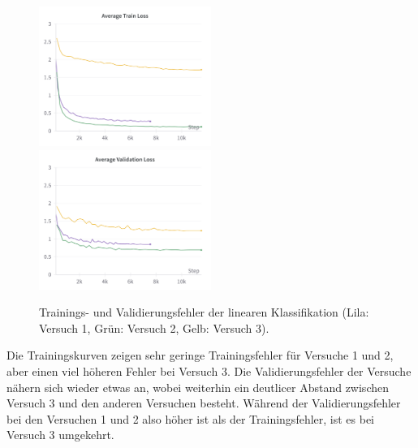 \begin{figure}[h]
	\centering
	\includegraphics[width=0.5\textwidth]{images/figure_results_supcon-lin_avg-train-loss.png}%
	\includegraphics[width=0.5\textwidth]{images/figure_results_supcon-lin_avg-val-loss.png}
	\caption[Trainings- und Validierungsfehler der linearen Klassifikation.]{Trainings- und Validierungsfehler der linearen Klassifikation (\textcolor{exp1}{Lila}: Versuch 1, \textcolor{exp2}{Grün}: Versuch 2, \textcolor{exp3}{Gelb}: Versuch 3).}
	\label{fig:supcon-lin-loss}
\end{figure}

Die Trainingskurven zeigen sehr geringe Trainingsfehler für Versuche 1 und 2, aber einen viel höheren Fehler bei Versuch 3. Die Validierungsfehler der Versuche nähern sich wieder etwas an, wobei weiterhin ein deutlicer Abstand zwischen Versuch 3 und den anderen Versuchen besteht. Während der Validierungsfehler bei den Versuchen 1 und 2 also höher ist als der Trainingsfehler, ist es bei Versuch 3 umgekehrt.

